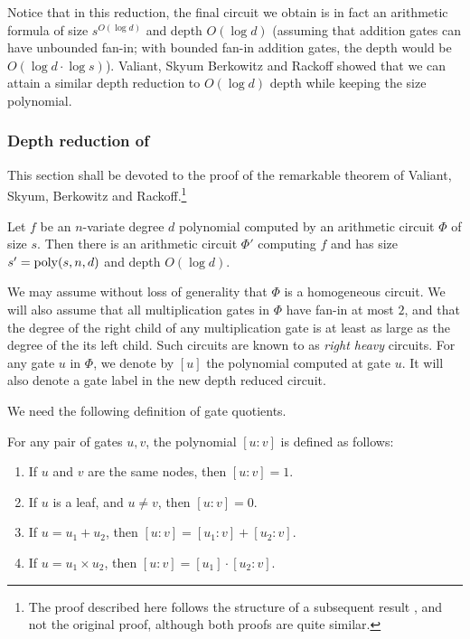 Notice that in this reduction, the final circuit we obtain is in fact an arithmetic formula of size $s^{O(\log d)}$ and depth $O(\log d)$ (assuming that addition gates can have unbounded fan-in; with bounded fan-in addition gates, the depth would be $O(\log d \cdot \log s)$). 
Valiant, Skyum Berkowitz and Rackoff \cite{vsbr83} showed that we can attain a similar depth reduction to $O(\log d)$ depth while keeping the size polynomial. 


\subsubsection{Depth reduction of \cite{vsbr83}}


This section shall be devoted to the proof of the remarkable theorem of Valiant, Skyum, Berkowitz and Rackoff.\footnote{The proof described here follows the structure of a subsequent result \cite{ajmv98}, and not the original proof, although both proofs are quite similar.}


\begin{theorem}\label{thm:vsbr}
  Let $f$ be an $n$-variate degree $d$ polynomial computed by an
  arithmetic circuit $\Phi$ of size $s$. 
Then there is an arithmetic
  circuit $\Phi'$ computing $f$ and has size $s' = \operatorname{poly}(s,n,d)$ and
  depth $O(\log d)$.
\end{theorem}

We may assume without loss of generality that $\Phi$ is a homogeneous
circuit. 
We will also assume that all multiplication gates in $\Phi$
have fan-in at most $2$, and that the degree of the right child of any
multiplication gate is at least as large as the degree of the its left
child. 
Such circuits are known to as \emph{right heavy} circuits. 
For any gate $u$ in $\Phi$, we denote by $[u]$ the polynomial computed at
gate $u$. 
It will also denote a gate label in the new depth reduced
circuit.

We need the following definition of gate quotients.

\begin{definition}\label{defn:gate-quotient}
For any pair of gates $u,v$, the polynomial $[u:v]$ is defined as follows:
\begin{enumerate}
\item If $u$ and $v$ are the same nodes, then $[u:v] = 1$. 
\item If $u$ is a leaf, and $u\neq v$, then $[u:v] = 0$. 
\item If $u = u_1 + u_2$, then $[u:v] = [u_1:v] + [u_2:v]$.
\item If $u = u_1 \times u_2$, then $[u:v] = [u_1] \cdot [u_2 : v]$. \qedhere
\end{enumerate}
\end{definition}

